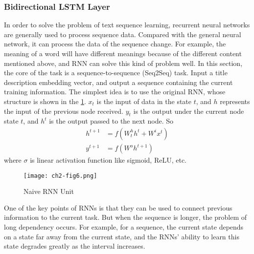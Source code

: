 \subsubsection{Bidirectional LSTM Layer}


In order to solve the problem of text sequence learning, recurrent neural networks are generally used to process sequence data. Compared with the general neural network, it can process the data of the sequence change. For example, the meaning of a word will have different meanings because of the different content mentioned above, and RNN can solve this kind of problem well. In this section, the core of the task is a sequence-to-sequence (Seq2Seq) task. Input a title description embedding vector, and output a sequence containing the current training information. The simplest idea is to use the original RNN, whose structure is shown in the \figurename{\ref{ch2-fig6}}. \(x_t\) is the input of data in the state \(t\), and \(h\) represents the input of the previous node received. \(y_t\) is the output under the current node state \(t\), and \(h^{t}\) is the output passed to the next node. So
\begin{align}
	h^{t+1} & =f(W^h_{t} h^t+W^i x^t) \\
	y^{t+1} & =f(W^o h^{t+1})
\end{align}
where \(\sigma \) is linear activation function like sigmoid, ReLU, etc.

\begin{figure}[h]
	\centering
	\texttt{[image: ch2-fig6.png]}
	\caption{Naive RNN Unit}\label{ch2-fig6}
\end{figure}

One of the key points of RNNs is that they can be used to connect previous information to the current task. But when the sequence is longer, the problem of long dependency occurs. For example, for a sequence, the current state depends on a state far away from the current state, and the RNNs' ability to learn this state degrades greatly as the interval increases.

